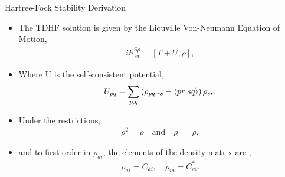 \documentclass[10pt]{beamer}
\begin{document}
{{{{{{{{{{{{{{%
\begin{frame}{Hartree-Fock Stability Derivation}
	\begin{itemize}[<+->]
		\item[]{The TDHF solution is given by the Liouville Von-Neumann Equation of Motion,
			\begin{eqnarray}
				i\hbar\frac{\partial \rho}{\partial t} = \left[ T+U, \rho \right],
			\end{eqnarray}
		}
		\item[]{Where U is the self-consistent potential,
			\begin{eqnarray}
				U_{pq} = \sum\limits_{p,q} \left(\rho_{pq,rs} - \braket{pr|sq} \right) \rho_{sr}.
			\end{eqnarray}
		}
		\item[]{Under the restrictions,
			\begin{eqnarray}
				\rho^2 = \rho \quad \textrm{and} \quad \rho^{\dagger} = \rho,
			\end{eqnarray}
		}
		\item[]{and to first order in $\rho_{ai}$, the elements of the density matrix are ,
			\begin{eqnarray}
				\rho_{ai} = C_{ai}, \quad \rho_{ia} = C_{ai}^*.
			\end{eqnarray}
		}
	\end{itemize}
\end{frame}

{%

}}}}}}}}}}}}}}}
\end{document}
